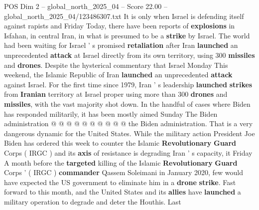 \begin{textsample}{POS Dim 2 – global\_north\_2025\_04 – Score 22.00 – global\_north\_2025\_04/123486307.txt}
It is only when Israel is defending itself against rapists and Friday Today, there have been reports of \textbf{explosions} in Isfahan, in central Iran, in what is presumed to be a \textbf{strike} by Israel.
The world had been waiting for Israel ' s promised \textbf{retaliation} after Iran \textbf{launched} an unprecedented \textbf{attack} at Israel directly from its own territory, using 300 \textbf{missiles} and \textbf{drones}.
Despite the hysterical commentary that Israel Monday This weekend, the Islamic Republic of Iran \textbf{launched} an unprecedented \textbf{attack} against Israel.
For the first time since 1979, Iran ' s leadership \textbf{launched} \textbf{strikes} from \textbf{Iranian} territory at Israel proper using more than 300 \textbf{drones} and \textbf{missiles}, with the vast majority shot down.
In the handful of cases where Biden has responded militarily, it has been mostly aimed Sunday The Biden administration @ @ @ @ @ @ @ @ @ @ the Biden administration.
That is a very dangerous dynamic for the United States.
While the military action President Joe Biden has ordered this week to counter the Islamic \textbf{Revolutionary} \textbf{Guard} Corps ( IRGC ) and its \textbf{axis} of resistance is degrading Iran ' s capacity, it Friday A month before the \textbf{targeted} killing of the Islamic \textbf{Revolutionary} \textbf{Guard} Corps ' ( IRGC ) \textbf{commander} Qassem Soleimani in January 2020, few would have expected the US government to eliminate him in a \textbf{drone} \textbf{strike}.
Fast forward to this month, and the United States and its \textbf{allies} have \textbf{launched} a military operation to degrade and deter the Houthis.
Last

\end{textsample}
